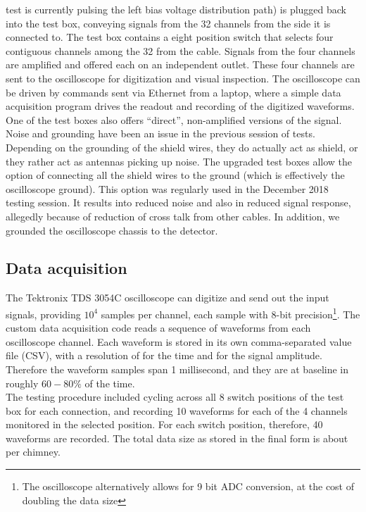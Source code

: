 test is currently pulsing the left bias voltage distribution path) is plugged
back into the test box, conveying signals from the 32 channels from the \DBB
side it is connected to.
The test box contains a eight position switch that selects four contiguous
channels among the 32 from the cable.
Signals from the four channels are amplified and offered each on an independent
outlet.
These four channels are sent to the oscilloscope for digitization and visual
inspection.
The oscilloscope can be driven by commands sent via Ethernet from a laptop,
where a simple data acquisition program drives the readout and recording of the
digitized waveforms.
One of the test boxes also offers ``direct'', non-amplified versions of the
signal.
\\
Noise and grounding have been an issue in the previous session of tests.
Depending on the grounding of the shield wires, they do actually act as shield,
or they rather act as antennas picking up noise.
The upgraded test boxes allow the option of connecting all the shield wires to
the ground (which is effectively the oscilloscope ground).
This option was regularly used in the December 2018 testing session.
It results into reduced noise and also in reduced signal response, allegedly
because of reduction of cross talk from other cables.
In addition, we grounded the oscilloscope chassis to the detector.


\subsection{Data acquisition}
\label{ssec:operations:DAQ}

The Tektronix TDS 3054C oscilloscope can digitize and send out the input
signals, providing $10^4$ samples per channel,
each sample with 8-bit precision\footnote{
The oscilloscope alternatively allows for 9 bit ADC conversion, at the cost of
doubling the data size}.
The custom data acquisition code reads a sequence of waveforms from each
oscilloscope channel.
Each waveform is stored in its own comma-separated value file (CSV),
with a resolution of  for the time and  for the signal
amplitude. Therefore the waveform samples span 1 millisecond, and they are at
baseline in roughly $60-80\%$ of the time.
\\
The testing procedure included cycling across all 8 switch positions of the test
box for each connection, and recording 10 waveforms for each of the 4 channels
monitored in the selected position. For each switch position, therefore,
40 waveforms are recorded. The total data size as stored in the final form is
about  per chimney.


